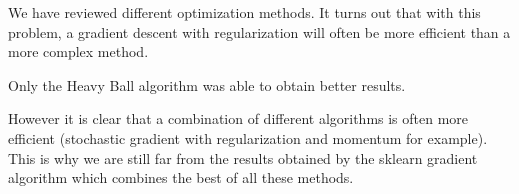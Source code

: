 \documentclass{article}
\begin{document}
We have reviewed different optimization methods. It turns out that with this problem, a gradient descent with regularization will often be more efficient than a more complex method. 

Only the Heavy Ball algorithm was able to obtain better results. 

However it is clear that a combination of different algorithms is often more efficient (stochastic gradient with regularization and momentum for example). This is why we are still far from the results obtained by the sklearn gradient algorithm which combines the best of all these methods.


\nocite{*}


\end{document}
